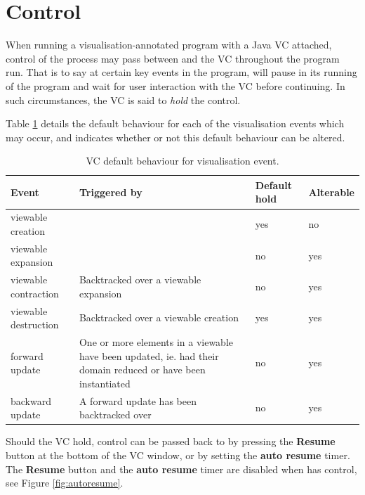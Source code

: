 \section{Control}

When running a visualisation-annotated {\eclipse} program with a Java
VC attached, control of the {\eclipse} process may pass between
{\eclipse} and the VC throughout the program run.  That is to say at
certain key events in the program, {\eclipse} will pause in its
running of the program and wait for user interaction with the VC
before continuing.  In such circumstances, the VC is said to
\emph{hold} the control.

Table \ref{tab:events} details the default behaviour for each of the
visualisation events which may occur, and indicates whether or not
this default behaviour can be altered.

\begin{table}[htsp]
\label{tab:events}
\begin{tabular}{|l|p{7cm}|l|l|}
\hline
Event & Triggered by & Default hold & Alterable \\
\hline
\hline
viewable creation &
\viewablecreatetwo{} \viewablecreatethree{} \viewablecreatefour{} &
yes &
no \\
\hline
viewable expansion &
\viewableexpandthree{} \viewableexpandfour{} &
no &
yes \\
\hline
viewable contraction &
Backtracked over a viewable expansion &
no &
yes \\
\hline
viewable destruction &
Backtracked over a viewable creation &
yes &
yes \\
\hline
forward update &
One or more elements in a viewable have been updated, ie. had their
domain reduced or have been instantiated &
no &
yes \\
\hline
backward update &
A forward update has been backtracked over &
no &
yes \\
\hline
\end{tabular}
\caption{VC default behaviour for visualisation event.}
\end{table}

Should the VC hold, control can be passed back to {\eclipse} by
pressing the \textbf{Resume} button at the bottom of the VC window, or
by setting the \textbf{auto resume} timer.  The \textbf{Resume} button
and the \textbf{auto resume} timer are disabled when {\eclipse} has
control, see Figure \ref{fig:autoresume}.

